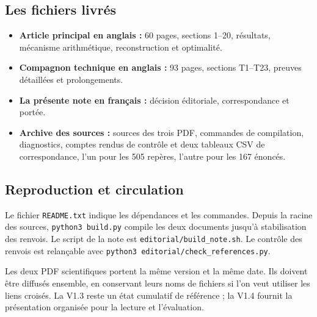\documentclass[11pt,a4paper]{article}
\begin{document}
\subsection*{Les fichiers livrés}
\begin{itemize}
\item \textbf{Article principal en anglais :} 60 pages, sections 1--20,
résultats, mécanisme arithmétique, reconstruction et optimalité.
\item \textbf{Compagnon technique en anglais :} 93 pages, sections T1--T23,
preuves détaillées et prolongements.
\item \textbf{La présente note en français :} décision éditoriale,
correspondance et portée.
\item \textbf{Archive des sources :} sources des trois PDF, commandes
de compilation, diagnostics, comptes rendus de contrôle et deux tableaux
CSV de correspondance, l'un pour les 505 repères, l'autre pour les
167 énoncés.
\end{itemize}

\subsection*{Reproduction et circulation}
Le fichier \texttt{README.txt} indique les dépendances et les commandes.
Depuis la racine des sources, \texttt{python3 build.py} compile les deux
documents jusqu'à stabilisation des renvois. Le script de la note est
\texttt{editorial/build\_note.sh}. Le contrôle des renvois est relançable
avec \texttt{python3 editorial/check\_references.py}.

Les deux PDF scientifiques portent la même version et la même date.
Ils doivent être diffusés ensemble, en conservant leurs noms de fichiers
si l'on veut utiliser les liens croisés. La V1.3 reste un état cumulatif
de référence ; la V1.4 fournit la présentation organisée pour la lecture
et l'évaluation.
\end{document}
